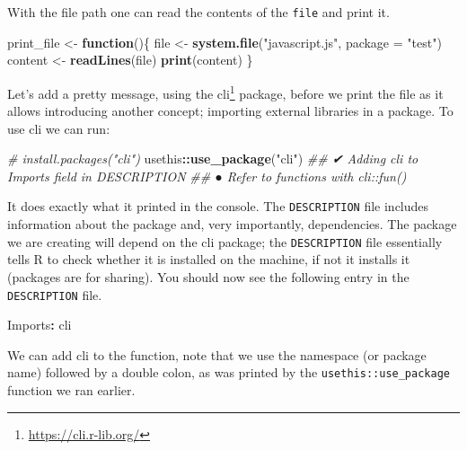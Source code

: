 \documentclass[
]{krantz}
\makeatletter
\newenvironment{Shaded}{\begin{snugshade}}{\end{snugshade}}
\newcommand{\CommentTok}[1]{\textcolor[rgb]{0.37,0.37,0.37}{\textit{#1}}}
\newcommand{\ControlFlowTok}[1]{\textcolor[rgb]{0.27,0.27,0.27}{\textbf{#1}}}
\newcommand{\DataTypeTok}[1]{\textcolor[rgb]{0.27,0.27,0.27}{#1}}
\newcommand{\KeywordTok}[1]{\textcolor[rgb]{0.27,0.27,0.27}{\textbf{#1}}}
\newcommand{\NormalTok}[1]{#1}
\newcommand{\OperatorTok}[1]{\textcolor[rgb]{0.43,0.43,0.43}{\textbf{#1}}}
\newcommand{\StringTok}[1]{\textcolor[rgb]{0.5,0.5,0.5}{#1}}
\renewcommand{\href}[2]{#2\footnote{\url{#1}}}
\newenvironment{kframe}{%
\medskip{}
\setlength{\fboxsep}{.8em}
 \def\at@end@of@kframe{}%
 \ifinner\ifhmode%
  \def\at@end@of@kframe{\end{minipage}}%
  \begin{minipage}{\columnwidth}%
 \fi\fi%
 \def\FrameCommand##1{\hskip\@totalleftmargin \hskip-\fboxsep
 \colorbox{shadecolor}{##1}\hskip-\fboxsep
     \hskip-\linewidth \hskip-\@totalleftmargin \hskip\columnwidth}%
 \MakeFramed {\advance\hsize-\width
   \@totalleftmargin\z@ \linewidth\hsize
   \@setminipage}}%
 {\par\unskip\endMakeFramed%
 \at@end@of@kframe}
\renewenvironment{Shaded}{\begin{kframe}}{\end{kframe}}
\makeatother
\begin{document}
With the file path one can read the contents of the \texttt{file} and print it.

\begin{Shaded}
\begin{Highlighting}[]
\NormalTok{print\_file \textless{}{-}}\StringTok{ }\ControlFlowTok{function}\NormalTok{()\{}
\NormalTok{  file \textless{}{-}}\StringTok{ }\KeywordTok{system.file}\NormalTok{(}\StringTok{"javascript.js"}\NormalTok{, }\DataTypeTok{package =} \StringTok{"test"}\NormalTok{)}
\NormalTok{  content \textless{}{-}}\StringTok{ }\KeywordTok{readLines}\NormalTok{(file)}
  \KeywordTok{print}\NormalTok{(content)}
\NormalTok{\}}
\end{Highlighting}
\end{Shaded}

Let's add a pretty message, using the \href{https://cli.r-lib.org/}{cli} \citep{R-cli} package, before we print the file as it allows introducing another concept; importing external libraries in a package. To use cli we can run:

\begin{Shaded}
\begin{Highlighting}[]
\CommentTok{\# install.packages("cli")}
\NormalTok{usethis}\OperatorTok{::}\KeywordTok{use\_package}\NormalTok{(}\StringTok{"cli"}\NormalTok{)}
\CommentTok{\#\# ✔ Adding \textquotesingle{}cli\textquotesingle{} to Imports field in DESCRIPTION}
\CommentTok{\#\# ● Refer to functions with \textasciigrave{}cli::fun()\textasciigrave{}}
\end{Highlighting}
\end{Shaded}

It does exactly what it printed in the console. The \texttt{DESCRIPTION} file includes information about the package and, very importantly, dependencies. The package we are creating will depend on the cli package; the \texttt{DESCRIPTION} file essentially tells R to check whether it is installed on the machine, if not it installs it (packages are for sharing). You should now see the following entry in the \texttt{DESCRIPTION} file.

\begin{Shaded}
\begin{Highlighting}[]
\NormalTok{Imports}\OperatorTok{:}\StringTok{ }
\StringTok{    }\NormalTok{cli}
\end{Highlighting}
\end{Shaded}

We can add cli to the function, note that we use the namespace (or package name) followed by a double colon, as was printed by the \texttt{usethis::use\_package} function we ran earlier.
\end{document}
